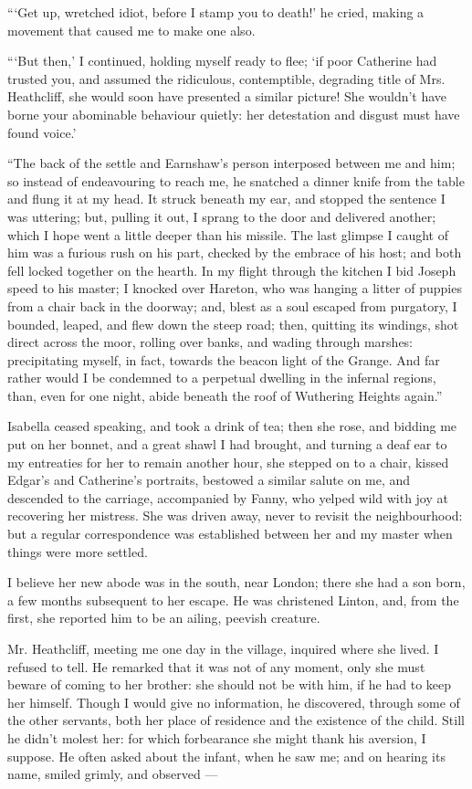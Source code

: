 \par “‘Get up, wretched idiot, before I stamp you to death!’ he cried, making a movement that caused me to make one also.
\par “‘But then,’ I continued, holding myself ready to flee; ‘if poor Catherine had trusted you, and assumed the ridiculous, contemptible, degrading title of Mrs. Heathcliff, she would soon have presented a similar picture! She wouldn't have borne your abominable behaviour quietly: her detestation and disgust must have found voice.’
\par “The back of the settle and Earnshaw's person interposed between me and him; so instead of endeavouring to reach me, he snatched a dinner knife from the table and flung it at my head. It struck beneath my ear, and stopped the sentence I was uttering; but, pulling it out, I sprang to the door and delivered another; which I hope went a little deeper than his missile. The last glimpse I caught of him was a furious rush on his part, checked by the embrace of his host; and both fell locked together on the hearth. In my flight through the kitchen I bid Joseph speed to his master; I knocked over Hareton, who was hanging a litter of puppies from a chair back in the doorway; and, blest as a soul escaped from purgatory, I bounded, leaped, and flew down the steep road; then, quitting its windings, shot direct across the moor, rolling over banks, and wading through marshes: precipitating myself, in fact, towards the beacon light of the Grange. And far rather would I be condemned to a perpetual dwelling in the infernal regions, than, even for one night, abide beneath the roof of Wuthering Heights again.”
\par Isabella ceased speaking, and took a drink of tea; then she rose, and bidding me put on her bonnet, and a great shawl I had brought, and turning a deaf ear to my entreaties for her to remain another hour, she stepped on to a chair, kissed Edgar's and Catherine's portraits, bestowed a similar salute on me, and descended to the carriage, accompanied by Fanny, who yelped wild with joy at recovering her mistress. She was driven away, never to revisit the neighbourhood: but a regular correspondence was established between her and my master when things were more settled.
\par I believe her new abode was in the south, near London; there she had a son born, a few months subsequent to her escape. He was christened Linton, and, from the first, she reported him to be an ailing, peevish creature.
\par Mr. Heathcliff, meeting me one day in the village, inquired where she lived. I refused to tell. He remarked that it was not of any moment, only she must beware of coming to her brother: she should not be with him, if he had to keep her himself. Though I would give no information, he discovered, through some of the other servants, both her place of residence and the existence of the child. Still he didn't molest her: for which forbearance she might thank his aversion, I suppose. He often asked about the infant, when he saw me; and on hearing its name, smiled grimly, and observed —
